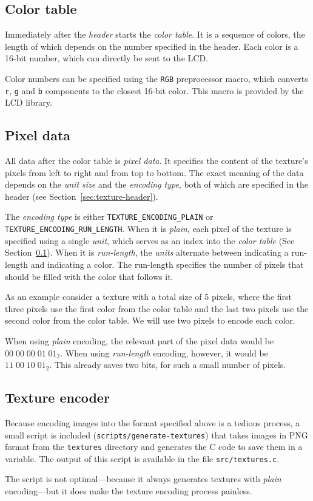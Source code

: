 \subsection{Color table}
\label{sec:texture-color-table}

Immediately after the \emph{header} starts the \emph{color table}. It is a
sequence of colors, the length of which depends on the number specified in the
header. Each color is a 16-bit number, which can directly be sent to the LCD\@.

Color numbers can be specified using the \texttt{RGB} preprocessor macro, which
converts \texttt{r}, \texttt{g} and \texttt{b} components to the closest 16-bit
color. This macro is provided by the LCD library.

\subsection{Pixel data}
\label{sec:texture-pixel-data}

All data after the color table is \emph{pixel data}. It specifies the content
of the texture's pixels from left to right and from top to bottom. The exact
meaning of the data depends on the \emph{unit size} and the \emph{encoding
  type}, both of which are specified in the header (see
Section~\ref{sec:texture-header}).

The \emph{encoding type} is either \texttt{TEXTURE\_ENCODING\_PLAIN} or
\texttt{TEXTURE\_ENCODING\_RUN\_LENGTH}. When it is \emph{plain}, each pixel of
the texture is specified using a single \emph{unit}, which serves as an index
into the \emph{color table} (See Section~\ref{sec:texture-color-table}). When
it is \emph{run-length}, the \emph{units} alternate between indicating a
run-length and indicating a color. The run-length specifies the number of
pixels that should be filled with the color that follows it.

As an example consider a texture with a total size of 5 pixels, where the first
three pixels use the first color from the color table and the last two pixels
use the second color from the color table. We will use two pixels to encode
each color.

When using \emph{plain} encoding, the relevant part of the pixel data would be
$00\;00\;00\;01\;01_2$. When using \emph{run-length} encoding, however, it
would be $11\;00\;10\;01_2$. This already saves two bits, for such a small
number of pixels.

\subsection{Texture encoder}
\label{sec:texture-encoder}

Because encoding images into the format specified above is a tedious process, a
small script is included (\texttt{scripts/generate-textures}) that takes images
in PNG format from the \texttt{textures} directory and generates the C code to
save them in a variable. The output of this script is available in the file
\texttt{src/textures.c}.

The script is not optimal---because it always generates textures with
\emph{plain} encoding---but it does make the texture encoding process painless.
